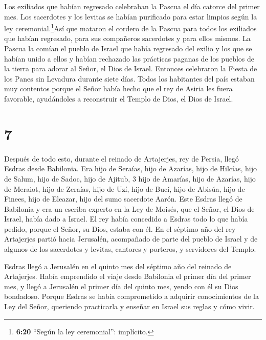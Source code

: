  Los exiliados que habían regresado celebraban la Pascua el
día catorce del primer mes.  Los sacerdotes y los levitas
se habían purificado para estar limpios según la ley
ceremonial.\footnote{\textbf{6:20} ``Según la ley ceremonial'':
  implícito.}Así que mataron el cordero de la Pascua para todos los
exiliados que habían regresado, para sus compañeros sacerdotes y para
ellos mismos.  La Pascua la comían el pueblo de Israel que
había regresado del exilio y los que se habían unido a ellos y habían
rechazado las prácticas paganas de los pueblos de la tierra para adorar
al Señor, el Dios de Israel.  Entonces celebraron la Fiesta
de los Panes sin Levadura durante siete días. Todos los habitantes del
país estaban muy contentos porque el Señor había hecho que el rey de
Asiria les fuera favorable, ayudándoles a reconstruir el Templo de Dios,
el Dios de Israel.

\hypertarget{section-6}{%
\section{7}\label{section-6}}

 Después de todo esto, durante el reinado de Artajerjes, rey
de Persia, llegó Esdras desde Babilonia. Era hijo de Seraías, hijo de
Azarías, hijo de Hilcías,  hijo de Salum, hijo de Sadoc,
hijo de Ajitub, 3 hijo de Amarías, hijo de Azarías, hijo de Meraiot,
 hijo de Zeraías, hijo de Uzí, hijo de Bucí, 
hijo de Abisúa, hijo de Finees, hijo de Eleazar, hijo del sumo sacerdote
Aarón.  Este Esdras llegó de Babilonia y era un escriba
experto en la Ley de Moisés, que el Señor, el Dios de Israel, había dado
a Israel. El rey había concedido a Esdras todo lo que había pedido,
porque el Señor, su Dios, estaba con él.  En el séptimo año
del rey Artajerjes partió hacia Jerusalén, acompañado de parte del
pueblo de Israel y de algunos de los sacerdotes y levitas, cantores y
porteros, y servidores del Templo.

 Esdras llegó a Jerusalén en el quinto mes del séptimo año
del reinado de Artajerjes.  Había emprendido el viaje desde
Babilonia el primer día del primer mes, y llegó a Jerusalén el primer
día del quinto mes, yendo con él su Dios bondadoso.  Porque
Esdras se había comprometido a adquirir conocimientos de la Ley del
Señor, queriendo practicarla y enseñar en Israel sus reglas y cómo
vivir.

